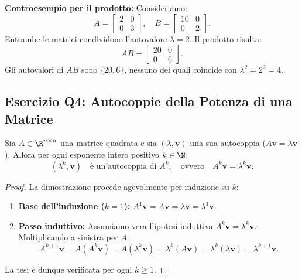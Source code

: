 \begin{example}
\medskip
\noindent\textbf{Controesempio per il prodotto:}
Consideriamo:
\begin{equation}
    A = \begin{bmatrix} 2 & 0 \\ 0 & 3 \end{bmatrix}, \quad B = \begin{bmatrix} 10 & 0 \\ 0 & 2 \end{bmatrix}.
\end{equation}
Entrambe le matrici condividono l'autovalore $\lambda = 2$. Il prodotto risulta:
\begin{equation}
    AB = \begin{bmatrix} 20 & 0 \\ 0 & 6 \end{bmatrix}.
\end{equation}
Gli autovalori di $AB$ sono $\{20, 6\}$, nessuno dei quali coincide con $\lambda^2 = 2^2 = 4$.
\end{example}

\subsection{Esercizio Q4: Autocoppie della Potenza di una Matrice}

\begin{theorem}
\label{thm:potenza-matrice}
Sia $A \in \R^{n \times n}$ una matrice quadrata e sia $(\lambda, \mathbf{v})$ una sua autocoppia ($A\mathbf{v} = \lambda \mathbf{v}$). Allora per ogni esponente intero positivo $k \in \N$:
\begin{equation}
    (\lambda^k, \mathbf{v}) \quad \text{\`e un'autocoppia di } A^k, \quad \text{ovvero} \quad A^k \mathbf{v} = \lambda^k \mathbf{v}.
\end{equation}
\end{theorem}

\begin{proof}
La dimostrazione procede agevolmente per induzione su $k$:
\begin{enumerate}
    \item \textbf{Base dell'induzione ($k=1$):} $A^1 \mathbf{v} = A\mathbf{v} = \lambda \mathbf{v} = \lambda^1 \mathbf{v}$.
    \item \textbf{Passo induttivo:} Assumiamo vera l'ipotesi induttiva $A^k \mathbf{v} = \lambda^k \mathbf{v}$. Moltiplicando a sinistra per $A$:
    \begin{equation}
        A^{k+1} \mathbf{v} = A(A^k \mathbf{v}) = A(\lambda^k \mathbf{v}) = \lambda^k (A\mathbf{v}) = \lambda^k (\lambda \mathbf{v}) = \lambda^{k+1} \mathbf{v}.
    \end{equation}
\end{enumerate}
La tesi \`e dunque verificata per ogni $k \ge 1$.
\end{proof}

